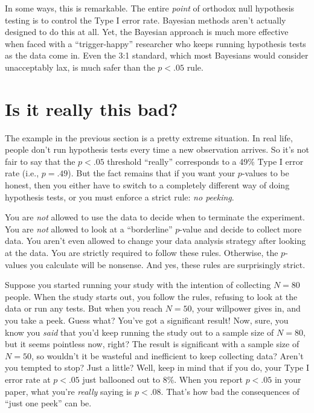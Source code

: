 \documentclass[
  11pt,
  a4paper,
  twoside,symmetric,openright]{book}
\theoremstyle{break}
\theoremstyle{break}
\begin{document}
In some ways, this is remarkable. The entire \emph{point} of orthodox null hypothesis testing is to control the Type I error rate. Bayesian methods aren't actually designed to do this at all. Yet, the Bayesian approach is much more effective when faced with a ``trigger-happy'' researcher who keeps running hypothesis tests as the data come in. Even the 3:1 standard, which most Bayesians would consider unacceptably lax, is much safer than the \(p<.05\) rule.

\section{Is it really this bad?}\label{is-it-really-this-bad}

The example in the previous section is a pretty extreme situation. In real life, people don't run hypothesis tests every time a new observation arrives. So it's not fair to say that the \(p<.05\) threshold ``really'' corresponds to a 49\% Type I error rate (i.e., \(p=.49\)). But the fact remains that if you want your \(p\)-values to be honest, then you either have to switch to a completely different way of doing hypothesis tests, or you must enforce a strict rule: \emph{no peeking}.

You are \emph{not} allowed to use the data to decide when to terminate the experiment. You are \emph{not} allowed to look at a ``borderline'' \(p\)-value and decide to collect more data. You aren't even allowed to change your data analysis strategy after looking at the data. You are strictly required to follow these rules. Otherwise, the \(p\)-values you calculate will be nonsense. And yes, these rules are surprisingly strict.

Suppose you started running your study with the intention of collecting \(N=80\) people. When the study starts out, you follow the rules, refusing to look at the data or run any tests. But when you reach \(N=50\), your willpower gives in, and you take a peek. Guess what? You've got a significant result! Now, sure, you know you \emph{said} that you'd keep running the study out to a sample size of \(N=80\), but it seems pointless now, right? The result is significant with a sample size of \(N=50\), so wouldn't it be wasteful and inefficient to keep collecting data? Aren't you tempted to stop? Just a little? Well, keep in mind that if you do, your Type I error rate at \(p<.05\) just ballooned out to 8\%. When you report \(p<.05\) in your paper, what you're \emph{really} saying is \(p<.08\). That's how bad the consequences of ``just one peek'' can be.
\end{document}
